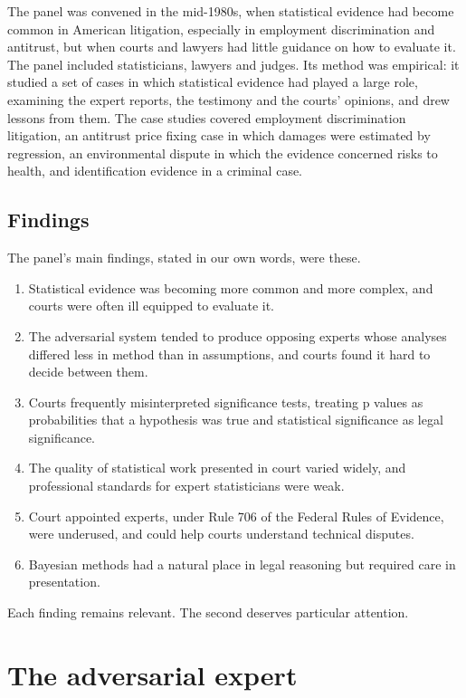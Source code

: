 The panel was convened in the mid-1980s, when statistical evidence had become common in American litigation, especially in employment discrimination and antitrust, but when courts and lawyers had little guidance on how to evaluate it. The panel included statisticians, lawyers and judges. Its method was empirical: it studied a set of cases in which statistical evidence had played a large role, examining the expert reports, the testimony and the courts' opinions, and drew lessons from them. The case studies covered employment discrimination litigation, an antitrust price fixing case in which damages were estimated by regression, an environmental dispute in which the evidence concerned risks to health, and identification evidence in a criminal case.

\subsection{Findings}

The panel's main findings, stated in our own words, were these.
\begin{enumerate}[label=(\roman*)]
\item Statistical evidence was becoming more common and more complex, and courts were often ill equipped to evaluate it.
\item The adversarial system tended to produce opposing experts whose analyses differed less in method than in assumptions, and courts found it hard to decide between them.
\item Courts frequently misinterpreted significance tests, treating p values as probabilities that a hypothesis was true and statistical significance as legal significance.
\item The quality of statistical work presented in court varied widely, and professional standards for expert statisticians were weak.
\item Court appointed experts, under Rule 706 of the Federal Rules of Evidence, were underused, and could help courts understand technical disputes.
\item Bayesian methods had a natural place in legal reasoning but required care in presentation.
\end{enumerate}
Each finding remains relevant. The second deserves particular attention.

\section{The adversarial expert}

